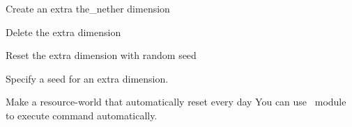 \begin{example}{Create an extra the\_nether dimension}
\end{example}

\begin{example}{Delete the extra dimension}
\end{example}

\begin{example}{Reset the extra dimension with random seed}
\end{example}

\begin{example}{Specify a seed for an extra dimension.}
    \\
\end{example}

\begin{tips}{Make a resource-world that automatically reset every day}
    You can use~ module to execute  command automatically.
\end{tips}